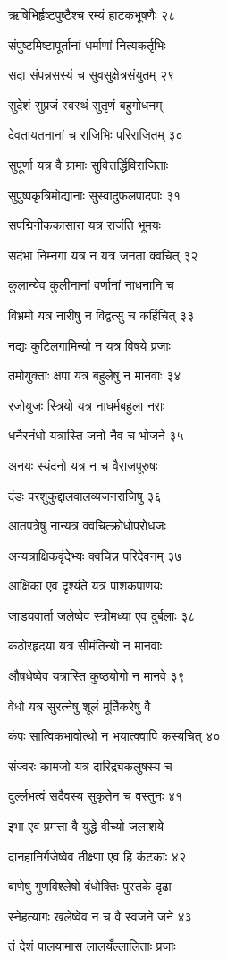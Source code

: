 ऋषिभिर्हृष्टपुष्टैश्च रम्यं हाटकभूषणैः २८

संपुष्टमिष्टापूर्तानां धर्माणां नित्यकर्तृभिः

सदा संपन्नसस्यं च सुवसुक्षेत्रसंयुतम् २९

सुदेशं सुप्रजं स्वस्थं सुतृणं बहुगोधनम्

देवतायतनानां च राजिभिः परिराजितम् ३०

सुपूर्णा यत्र वै ग्रामाः सुवित्तर्द्धिविराजिताः

सुपुष्पकृत्रिमोद्यानाः सुस्वादुफलपादपाः ३१

सपद्मिनीककासारा यत्र राजंति भूमयः

सदंभा निम्नगा यत्र न यत्र जनता क्वचित् ३२

कुलान्येव कुलीनानां वर्णानां नाधनानि च

विभ्रमो यत्र नारीषु न विद्वत्सु च कर्हिचित् ३३

नद्यः कुटिलगामिन्यो न यत्र विषये प्रजाः

तमोयुक्ताः क्षपा यत्र बहुलेषु न मानवाः ३४

रजोयुजः स्त्रियो यत्र नाधर्मबहुला नराः

धनैरनंधो यत्रास्ति जनो नैव च भोजने ३५

अनयः स्यंदनो यत्र न च वैराजपूरुषः

दंडः परशुकुद्दालवालव्यजनराजिषु ३६

आतपत्रेषु नान्यत्र क्वचित्क्रोधोपरोधजः

अन्यत्राक्षिकवृंदेभ्यः क्वचिन्न परिदेवनम् ३७

आक्षिका एव दृश्यंते यत्र पाशकपाणयः

जाड्यवार्ता जलेष्वेव स्त्रीमध्या एव दुर्बलाः ३८

कठोरहृदया यत्र सीमंतिन्यो न मानवाः

औषधेष्वेव यत्रास्ति कुष्ठयोगो न मानवे ३९

वेधो यत्र सुरत्नेषु शूलं मूर्तिकरेषु वै

कंपः सात्विकभावोत्थो न भयात्क्वापि कस्यचित् ४०

संज्वरः कामजो यत्र दारिद्र्यकलुषस्य च

दुर्ल्लभत्वं सदैवस्य सुकृतेन च वस्तुनः ४१

इभा एव प्रमत्ता वै युद्धे वीच्यो जलाशये

दानहानिर्गजेष्वेव तीक्ष्णा एव हि कंटकाः ४२

बाणेषु गुणविश्लेषो बंधोक्तिः पुस्तके दृढा

स्नेहत्यागः खलेष्वेव न च वै स्वजने जने ४३

तं देशं पालयामास लालयँल्लालिताः प्रजाः

